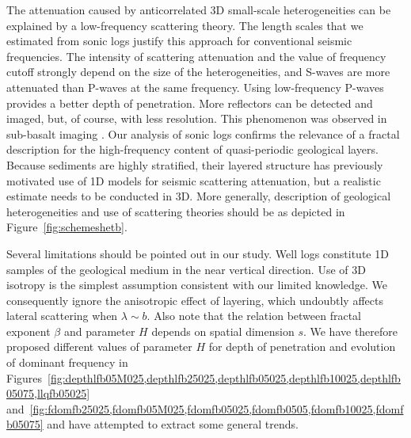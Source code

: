 The attenuation caused by anticorrelated 3D small-scale heterogeneities
can be explained by a low-frequency scattering theory.
The length scales that we estimated from sonic logs justify this approach 
for conventional seismic frequencies.
The intensity of scattering attenuation and the value of
frequency cutoff strongly depend on the size of the heterogeneities, and
S-waves are more attenuated than P-waves at the same frequency.
Using low-frequency P-waves provides a better depth of penetration. More reflectors can be detected and imaged,
but, of course, with less resolution. This phenomenon was observed  
in sub-basalt imaging \cite[]{Ziolkowski_HGJDHLL03}.
Our analysis of sonic logs confirms the relevance
of a fractal description for the high-frequency content of quasi-periodic geological layers.
Because sediments are highly stratified, their layered structure
has previously motivated use of 1D models for seismic scattering attenuation,
but a realistic estimate needs to be conducted in 3D.
More generally, description of geological heterogeneities and 
use of scattering theories should be as depicted in Figure~\ref{fig:schemeshetb}.

Several limitations should be pointed out in our study. 
Well logs constitute 1D samples of the geological medium in the near vertical direction.
Use of 3D isotropy is the simplest assumption 
consistent with our limited knowledge.
We consequently ignore the anisotropic effect of layering, which undoubtly affects lateral scattering when $\lambda\sim b$.
Also note that the relation between fractal exponent $\beta$
and parameter $H$ depends on spatial dimension $s$.
We have therefore proposed different values of parameter $H$ for depth of penetration and evolution of dominant frequency
in Figures~\ref{fig:depthlfb05M025,depthlfb25025,depthlfb05025,depthlfb10025,depthlfb05075,llqfb05025}
and~\ref{fig:fdomfb25025,fdomfb05M025,fdomfb05025,fdomfb0505,fdomfb10025,fdomfb05075}
and have attempted to extract some general trends.

